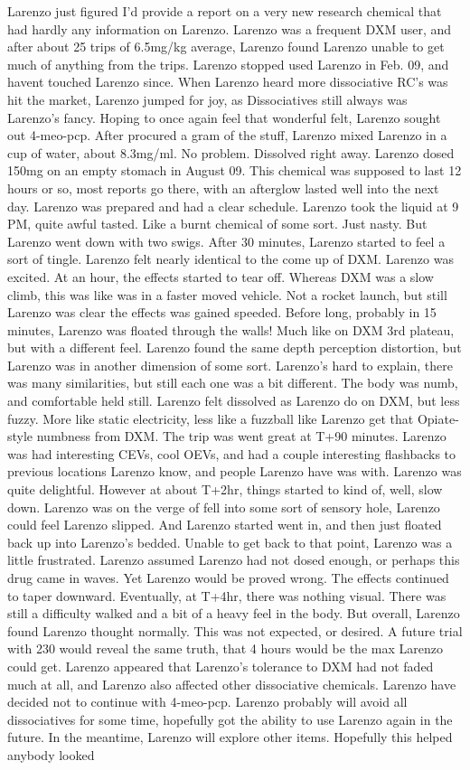 \documentclass[12pt]{book}
\begin{document}
Larenzo just figured I'd provide a report on a very new research chemical that had hardly any information on Larenzo. Larenzo was a frequent DXM user, and after about 25 trips of 6.5mg/kg average, Larenzo found Larenzo unable to get much of anything from the trips. Larenzo stopped used Larenzo in Feb. 09, and havent touched Larenzo since. When Larenzo heard more dissociative RC's was hit the market, Larenzo jumped for joy, as Dissociatives still always was Larenzo's fancy. Hoping to once again feel that wonderful felt, Larenzo sought out 4-meo-pcp. After procured a gram of the stuff, Larenzo mixed Larenzo in a cup of water, about 8.3mg/ml. No problem. Dissolved right away. Larenzo dosed 150mg on an empty stomach in August 09. This chemical was supposed to last 12 hours or so, most reports go there, with an afterglow lasted well into the next day. Larenzo was prepared and had a clear schedule. Larenzo took the liquid at 9 PM, quite awful tasted. Like a burnt chemical of some sort. Just nasty. But Larenzo went down with two swigs. After 30 minutes, Larenzo started to feel a sort of tingle. Larenzo felt nearly identical to the come up of DXM. Larenzo was excited. At an hour, the effects started to tear off. Whereas DXM was a slow climb, this was like was in a faster moved vehicle. Not a rocket launch, but still Larenzo was clear the effects was gained speeded. Before long, probably in 15 minutes, Larenzo was floated through the walls! Much like on DXM 3rd plateau, but with a different feel. Larenzo found the same depth perception distortion, but Larenzo was in another dimension of some sort. Larenzo's hard to explain, there was many similarities, but still each one was a bit different. The body was numb, and comfortable held still. Larenzo felt dissolved as Larenzo do on DXM, but less fuzzy. More like static electricity, less like a fuzzball like Larenzo get that Opiate-style numbness from DXM. The trip was went great at T+90 minutes. Larenzo was had interesting CEVs, cool OEVs, and had a couple interesting flashbacks to previous locations Larenzo know, and people Larenzo have was with. Larenzo was quite delightful. However at about T+2hr, things started to kind of, well, slow down. Larenzo was on the verge of fell into some sort of sensory hole, Larenzo could feel Larenzo slipped. And Larenzo started went in, and then just floated back up into Larenzo's bedded. Unable to get back to that point, Larenzo was a little frustrated. Larenzo assumed Larenzo had not dosed enough, or perhaps this drug came in waves. Yet Larenzo would be proved wrong. The effects continued to taper downward. Eventually, at T+4hr, there was nothing visual. There was still a difficulty walked and a bit of a heavy feel in the body. But overall, Larenzo found Larenzo thought normally. This was not expected, or desired. A future trial with 230 would reveal the same truth, that 4 hours would be the max Larenzo could get. Larenzo appeared that Larenzo's tolerance to DXM had not faded much at all, and Larenzo also affected other dissociative chemicals. Larenzo have decided not to continue with 4-meo-pcp. Larenzo probably will avoid all dissociatives for some time, hopefully got the ability to use Larenzo again in the future. In the meantime, Larenzo will explore other items. Hopefully this helped anybody looked 
\end{document}

